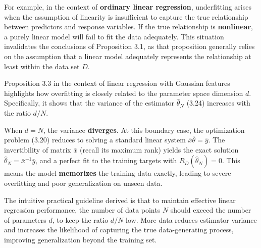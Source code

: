 \documentclass{report}
\begin{document}
For example, in the context of \textbf{ordinary linear regression}, underfitting arises when the assumption of linearity is insufficient to capture the true relationship between predictors and response variables. If the true relationship is \textbf{nonlinear}, a purely linear model will fail to fit the data adequately. This situation invalidates the conclusions of Proposition 3.1, as that proposition generally relies on the assumption that a linear model adequately represents the relationship at least within the data set $D$.

Proposition 3.3 in the context of linear regression with Gaussian features highlights how overfitting is closely related to the parameter space dimension $d$. Specifically, it shows that the variance of the estimator $\hat{\theta}_N$ (3.24) increases with the ratio $d/N$.

When $d = N$, the variance \textbf{diverges}. At this boundary case, the optimization problem (3.20) reduces to solving a standard linear system $\bar{x}\bar{\theta} = \bar{y}$. The invertibility of matrix $\bar{x}$ (recall its maximum rank) yields the exact solution $\hat{\theta}_N = \bar{x}^{-1}\bar{y}$, and a perfect fit to the training targets with $R_D(\hat{\theta}_N) = 0$. This means the model \textbf{memorizes} the training data exactly, leading to severe overfitting and poor generalization on unseen data.

The intuitive practical guideline derived is that to maintain effective linear regression performance, the number of data points $N$ should exceed the number of parameters $d$, to keep the ratio $d/N$ low. More data reduces estimator variance and increases the likelihood of capturing the true data-generating process, improving generalization beyond the training set.


\end{document}
